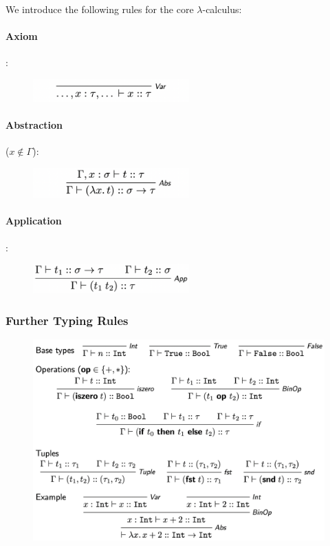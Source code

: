 \documentclass[a4paper]{extarticle}
\begin{document}
We introduce the following rules for the core \(\lambda\)-calculus:

\paragraph{Axiom}:

\begin{figure}[H]
    \includegraphics[width=6cm]{../images/FMFP_Fig5-1}
    \centering
\end{figure}

\paragraph{Abstraction} (\(x \notin \Gamma\)):

\begin{figure}[H]
    \includegraphics[width=6cm]{../images/FMFP_Fig5-2}
    \centering
\end{figure}

\paragraph{Application}:

\begin{figure}[H]
    \includegraphics[width=6cm]{../images/FMFP_Fig5-3}
    \centering
\end{figure}

\subsubsection{Further Typing Rules}

\begin{figure}[H]
    \includegraphics[width=15cm]{../images/FMFP_Fig5-4}
    \centering
\end{figure}
\end{document}
